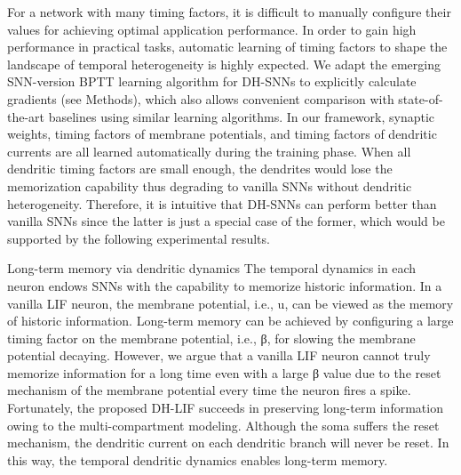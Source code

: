For a network with many timing factors, it is difficult to manually configure their values for achieving optimal application performance. In order to gain high performance in practical tasks, automatic learning of timing factors to shape the landscape of temporal heterogeneity is highly expected. We adapt the emerging SNN-version BPTT learning algorithm for DH-SNNs to explicitly calculate gradients (see Methods), which also allows convenient comparison with state-of-the-art baselines using similar learning algorithms. In our framework, synaptic weights, timing factors of membrane potentials, and timing factors of dendritic currents are all learned automatically during the training phase. When all dendritic timing factors are small enough, the dendrites would lose the memorization capability thus degrading to vanilla SNNs without dendritic heterogeneity. Therefore, it is intuitive that DH-SNNs can perform better than vanilla SNNs since the latter is just a special case of the former, which would be supported by the following experimental results.

Long-term memory via dendritic dynamics
The temporal dynamics in each neuron endows SNNs with the capability to memorize historic information. In a vanilla LIF neuron, the membrane potential, i.e., u, can be viewed as the memory of historic information. Long-term memory can be achieved by configuring a large timing factor on the membrane potential, i.e., β, for slowing the membrane potential decaying. However, we argue that a vanilla LIF neuron cannot truly memorize information for a long time even with a large β value due to the reset mechanism of the membrane potential every time the neuron fires a spike. Fortunately, the proposed DH-LIF succeeds in preserving long-term information owing to the multi-compartment modeling. Although the soma suffers the reset mechanism, the dendritic current on each dendritic branch will never be reset. In this way, the temporal dendritic dynamics enables long-term memory.

